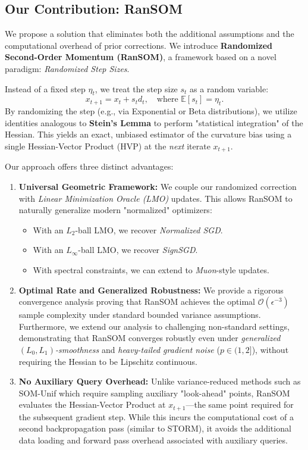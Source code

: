 \documentclass{article}
\theoremstyle{plain}
\theoremstyle{definition}
\theoremstyle{remark}
\begin{document}
\subsection{Our Contribution: RanSOM}
We propose a solution that eliminates both the additional assumptions and the computational overhead of prior corrections. We introduce \textbf{Randomized Second-Order Momentum (RanSOM)}, a framework based on a novel paradigm: \textit{Randomized Step Sizes}.

Instead of a fixed step $\eta_t$, we treat the step size $s_t$ as a random variable:
\begin{equation*}
    x_{t+1} = x_t + s_t d_t, \quad \text{where } \mathbb{E}[s_t] = \eta_t.
\end{equation*}
By randomizing the step (e.g., via Exponential or Beta distributions), we utilize identities analogous to \textbf{Stein's Lemma} to perform "statistical integration" of the Hessian. This yields an exact, unbiased estimator of the curvature bias using a single Hessian-Vector Product (HVP) at the \textit{next} iterate $x_{t+1}$.

Our approach offers three distinct advantages:

\begin{enumerate}
    \item \textbf{Universal Geometric Framework:} We couple our randomized correction with \textit{Linear Minimization Oracle (LMO)} updates. This allows RanSOM to naturally generalize modern "normalized" optimizers:
    \begin{itemize}
        \item With an $L_2$-ball LMO, we recover \textit{Normalized SGD}.
        \item With an $L_\infty$-ball LMO, we recover \textit{SignSGD}.
        \item With spectral constraints, we can extend to \textit{Muon}-style updates.
    \end{itemize}
    
    \item \textbf{Optimal Rate and Generalized Robustness:} We provide a rigorous convergence analysis proving that RanSOM achieves the optimal $\mathcal{O}(\epsilon^{-3})$ sample complexity under standard bounded variance assumptions. Furthermore, we extend our analysis to challenging non-standard settings, demonstrating that RanSOM converges robustly even under \textit{generalized $(L_0, L_1)$-smoothness} and \textit{heavy-tailed gradient noise} ($p \in (1, 2]$), without requiring the Hessian to be Lipschitz continuous.
    \item \textbf{No Auxiliary Query Overhead:} Unlike variance-reduced methods such as SOM-Unif which require sampling auxiliary "look-ahead" points, RanSOM evaluates the Hessian-Vector Product at $x_{t+1}$—the same point required for the subsequent gradient step. While this incurs the computational cost of a second backpropagation pass (similar to STORM), it avoids the additional data loading and forward pass overhead associated with auxiliary queries.
\end{enumerate}
\end{document}
